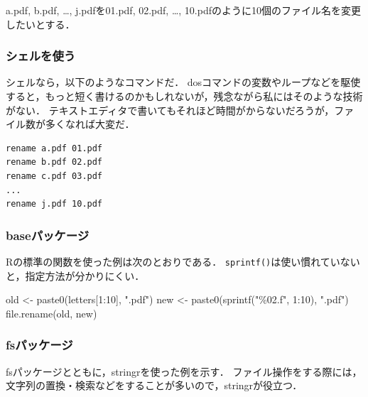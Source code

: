 \documentclass[
]{article}
\newenvironment{Shaded}{\begin{snugshade}}{\end{snugshade}}
\newcommand{\DecValTok}[1]{\textcolor[rgb]{0.00,0.00,0.81}{#1}}
\newcommand{\FunctionTok}[1]{\textcolor[rgb]{0.00,0.00,0.00}{#1}}
\newcommand{\NormalTok}[1]{#1}
\newcommand{\OtherTok}[1]{\textcolor[rgb]{0.56,0.35,0.01}{#1}}
\newcommand{\SpecialCharTok}[1]{\textcolor[rgb]{0.00,0.00,0.00}{#1}}
\newcommand{\StringTok}[1]{\textcolor[rgb]{0.31,0.60,0.02}{#1}}
\begin{document}
a.pdf, b.pdf, \ldots, j.pdfを01.pdf, 02.pdf, \ldots, 10.pdfのように10個のファイル名を変更したいとする．

\hypertarget{ux30b7ux30a7ux30ebux3092ux4f7fux3046}{%
\subsubsection{シェルを使う}\label{ux30b7ux30a7ux30ebux3092ux4f7fux3046}}

シェルなら，以下のようなコマンドだ．
dosコマンドの変数やループなどを駆使すると，もっと短く書けるのかもしれないが，残念ながら私にはそのような技術がない．
テキストエディタで書いてもそれほど時間がからないだろうが，ファイル数が多くなれば大変だ．

\begin{verbatim}
rename a.pdf 01.pdf
rename b.pdf 02.pdf
rename c.pdf 03.pdf
...
rename j.pdf 10.pdf
\end{verbatim}

\hypertarget{baseux30d1ux30c3ux30b1ux30fcux30b8}{%
\subsubsection{baseパッケージ}\label{baseux30d1ux30c3ux30b1ux30fcux30b8}}

Rの標準の関数を使った例は次のとおりである．
\texttt{sprintf()}は使い慣れていないと，指定方法が分かりにくい．

\begin{Shaded}
\begin{Highlighting}[]
\NormalTok{old }\OtherTok{\textless{}{-}} \FunctionTok{paste0}\NormalTok{(letters[}\DecValTok{1}\SpecialCharTok{:}\DecValTok{10}\NormalTok{], }\StringTok{".pdf"}\NormalTok{)}
\NormalTok{new }\OtherTok{\textless{}{-}} \FunctionTok{paste0}\NormalTok{(}\FunctionTok{sprintf}\NormalTok{(}\StringTok{"\%02.f"}\NormalTok{, }\DecValTok{1}\SpecialCharTok{:}\DecValTok{10}\NormalTok{), }\StringTok{".pdf"}\NormalTok{)}
\FunctionTok{file.rename}\NormalTok{(old, new)}
\end{Highlighting}
\end{Shaded}

\hypertarget{fsux30d1ux30c3ux30b1ux30fcux30b8}{%
\subsubsection{fsパッケージ}\label{fsux30d1ux30c3ux30b1ux30fcux30b8}}

fsパッケージとともに，stringrを使った例を示す．
ファイル操作をする際には，文字列の置換・検索などをすることが多いので，stringrが役立つ．
\end{document}
